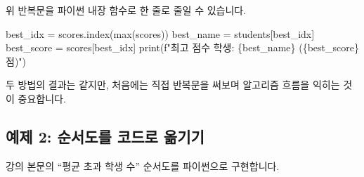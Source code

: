 \documentclass[
  korean,
  11pt,
  a4paper,
  DIV=11,
  numbers=noendperiod]{scrreprt}
\newenvironment{Shaded}{\begin{snugshade}}{\end{snugshade}}
\newcommand{\BuiltInTok}[1]{\textcolor[rgb]{0.00,0.23,0.31}{#1}}
\newcommand{\NormalTok}[1]{\textcolor[rgb]{0.00,0.23,0.31}{#1}}
\newcommand{\OperatorTok}[1]{\textcolor[rgb]{0.37,0.37,0.37}{#1}}
\newcommand{\SpecialCharTok}[1]{\textcolor[rgb]{0.37,0.37,0.37}{#1}}
\newcommand{\SpecialStringTok}[1]{\textcolor[rgb]{0.13,0.47,0.30}{#1}}
\begin{document}
\begin{tcolorbox}[enhanced jigsaw, arc=.35mm, bottomrule=.15mm, bottomtitle=1mm, breakable, colback=white, colbacktitle=quarto-callout-tip-color!10!white, colframe=quarto-callout-tip-color-frame, coltitle=black, left=2mm, leftrule=.75mm, opacityback=0, opacitybacktitle=0.6, rightrule=.15mm, title=\textcolor{quarto-callout-tip-color}{\faLightbulb}\hspace{0.5em}{파이썬 내장 함수로 더 간단하게}, titlerule=0mm, toprule=.15mm, toptitle=1mm]

위 반복문을 파이썬 내장 함수로 한 줄로 줄일 수 있습니다.

\begin{Shaded}
\begin{Highlighting}[]
\NormalTok{best\_idx   }\OperatorTok{=}\NormalTok{ scores.index(}\BuiltInTok{max}\NormalTok{(scores))}
\NormalTok{best\_name  }\OperatorTok{=}\NormalTok{ students[best\_idx]}
\NormalTok{best\_score }\OperatorTok{=}\NormalTok{ scores[best\_idx]}
\BuiltInTok{print}\NormalTok{(}\SpecialStringTok{f"최고 점수 학생: }\SpecialCharTok{\{}\NormalTok{best\_name}\SpecialCharTok{\}}\SpecialStringTok{ (}\SpecialCharTok{\{}\NormalTok{best\_score}\SpecialCharTok{\}}\SpecialStringTok{점)"}\NormalTok{)}
\end{Highlighting}
\end{Shaded}

두 방법의 결과는 같지만, 처음에는 직접 반복문을 써보며 알고리즘 흐름을
익히는 것이 중요합니다.

\end{tcolorbox}

\subsection{예제 2: 순서도를 코드로
옮기기}\label{uxc608uxc81c-2-uxc21cuxc11cuxb3c4uxb97c-uxcf54uxb4dcuxb85c-uxc62euxae30uxae30}

강의 본문의 ``평균 초과 학생 수'' 순서도를 파이썬으로 구현합니다.
\end{document}
